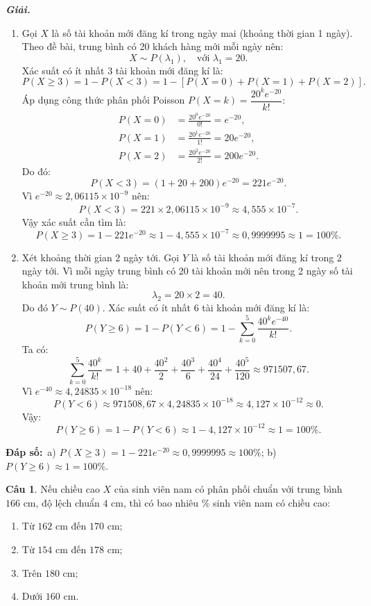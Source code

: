 \documentclass[12pt,a4paper]{article}
\theoremstyle{definition}
\newtheorem{cau}{Câu}
\newcommand{\giai}{\noindent\textbf{\textit{Giải.}}\ }
\newcommand{\dapso}[1]{\noindent\textbf{Đáp số:}\ #1}
\begin{document}
\giai
\begin{enumerate}[label=\alph*)]
    \item Gọi $X$ là số tài khoản mới đăng kí trong ngày mai (khoảng thời gian 1 ngày). Theo đề bài, trung bình có 20 khách hàng mới mỗi ngày nên:
    \[
    X \sim P(\lambda_1), \quad \text{với } \lambda_1 = 20.
    \]
    Xác suất có ít nhất 3 tài khoản mới đăng kí là:
    \[
    P(X \ge 3) = 1 - P(X < 3) = 1 - [P(X = 0) + P(X = 1) + P(X = 2)].
    \]
    Áp dụng công thức phân phối Poisson $P(X = k) = \dfrac{20^k e^{-20}}{k!}$:
    \begin{align*}
    P(X = 0) &= \frac{20^0 e^{-20}}{0!} = e^{-20}, \\
    P(X = 1) &= \frac{20^1 e^{-20}}{1!} = 20 e^{-20}, \\
    P(X = 2) &= \frac{20^2 e^{-20}}{2!} = 200 e^{-20}.
    \end{align*}
    Do đó:
    \[
    P(X < 3) = (1 + 20 + 200) e^{-20} = 221 e^{-20}.
    \]
    Vì $e^{-20} \approx 2{,}06115 \times 10^{-9}$ nên:
    \[
    P(X < 3) = 221 \times 2{,}06115 \times 10^{-9} \approx 4{,}555 \times 10^{-7}.
    \]
    Vậy xác suất cần tìm là:
    \[
    P(X \ge 3) = 1 - 221 e^{-20} \approx 1 - 4{,}555 \times 10^{-7} \approx 0{,}9999995 \approx 1 = 100\%.
    \]

    \item Xét khoảng thời gian 2 ngày tới. Gọi $Y$ là số tài khoản mới đăng kí trong 2 ngày tới. Vì mỗi ngày trung bình có 20 tài khoản mới nên trong 2 ngày số tài khoản mới trung bình là:
    \[
    \lambda_2 = 20 \times 2 = 40.
    \]
    Do đó $Y \sim P(40)$. Xác suất có ít nhất 6 tài khoản mới đăng kí là:
    \[
    P(Y \ge 6) = 1 - P(Y < 6) = 1 - \sum_{k=0}^5 \frac{40^k e^{-40}}{k!}.
    \]
    Ta có:
    \[
    \sum_{k=0}^5 \frac{40^k}{k!} = 1 + 40 + \frac{40^2}{2} + \frac{40^3}{6} + \frac{40^4}{24} + \frac{40^5}{120} \approx 971507{,}67.
    \]
    Vì $e^{-40} \approx 4{,}24835 \times 10^{-18}$ nên:
    \[
    P(Y < 6) \approx 971508{,}67 \times 4{,}24835 \times 10^{-18} \approx 4{,}127 \times 10^{-12} \approx 0.
    \]
    Vậy:
    \[
    P(Y \ge 6) = 1 - P(Y < 6) \approx 1 - 4{,}127 \times 10^{-12} \approx 1 = 100\%.
    \]
\end{enumerate}

\dapso{a) $P(X \ge 3) = 1 - 221e^{-20} \approx 0{,}9999995 \approx 100\%$; \quad b) $P(Y \ge 6) \approx 1 = 100\%$.}

\vspace{1.5em}
\begin{cau}
Nếu chiều cao $X$ của sinh viên nam có phân phối chuẩn với trung bình $166\text{ cm}$, độ lệch chuẩn $4\text{ cm}$, thì có bao nhiêu $\%$ sinh viên nam có chiều cao:
\begin{enumerate}[label=(\arabic*)]
    \item Từ $162\text{ cm}$ đến $170\text{ cm}$;
    \item Từ $154\text{ cm}$ đến $178\text{ cm}$;
    \item Trên $180\text{ cm}$;
    \item Dưới $160\text{ cm}$.
\end{enumerate}
\end{cau}
\end{document}
